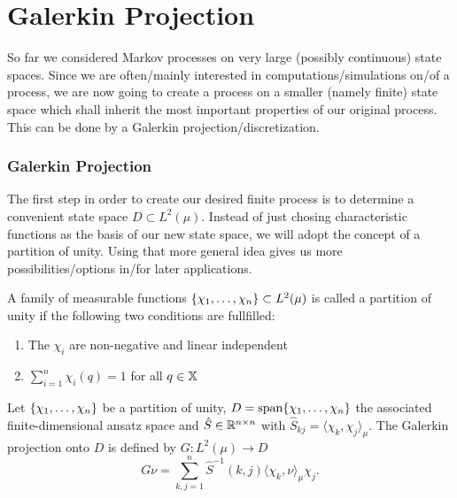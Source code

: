 \section{Galerkin Projection}
\label{sec:galerkin}

So far we considered Markov processes on very large (possibly continuous) state spaces. Since we are often/mainly interested in computations/simulations on/of a process, we are now going to create a process on a smaller (namely finite)  state space which shall inherit the most important properties of our original process. This can be done by a Galerkin projection/discretization.

\subsubsection*{Galerkin Projection}
The first step in order to create our desired finite process is to determine a convenient state space $D \subset L^2(\mu)$.
Instead of just chosing characteristic functions as the basis of our new state space, we will adopt the concept of a partition of unity. 
Using that more general idea gives us more possibilities/options in/for later applications.

\begin{defi}
A family of measurable functions $\{ \chi_1,\dots,\chi_n \} \subset L^2(\mu)$  is called a partition of unity if the following two conditions are fullfilled:
\begin{enumerate}
\item The $\chi_i$ are non-negative and  linear independent
\item $\sum_{i=1}^n \chi_i(q) = 1$ for all $q \in \mathbb{X}$ 
\end{enumerate}
\end{defi}

\begin{defi}
Let $\{ \chi_1,\dots,\chi_n \}$ be a partition of unity, $D = \mathrm{span}\{\chi_1,\dots,\chi_n\}$ the associated finite-dimensional ansatz space and $\hat{S} \in \mathbb{R}^{n\times n}$ with $\hat{S}_{kj} = \langle \chi_k, \chi_j \rangle_\mu$. The Galerkin projection onto $D$ is defined by $G: L^2 (\mu) \rightarrow D$
\begin{equation}
\label{eq:galerkin}
G\nu = \sum_{k,j=1}^n \hat{S}^{-1}(k,j) \langle \chi_k, \nu \rangle_\mu \chi_j.
\end{equation}
\end{defi}

